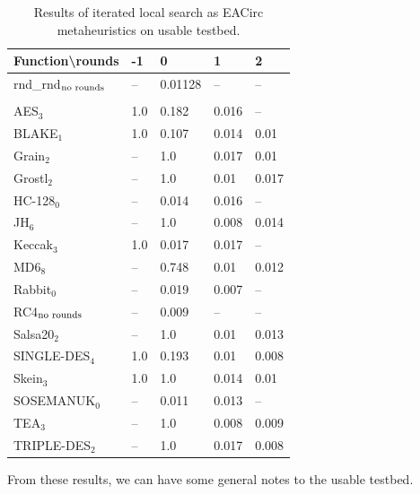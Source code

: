 \documentclass[
  print, %
  Table,   %
  nolof,     %
  nolot,     %
  11pt, %
  oneside  %
]{fithesis3}
\newcommand{\fd}{\cellcolor{red!13}}
\newcommand{\fn}{\cellcolor{green!13}}
\begin{document}
\begin{table}[H]
\centering
\begin{tabular}{l|l l l l}
Function\textbackslash{}rounds & -1 & 0 & 1 & 2\\ \hline
rnd\_rnd$_{\textnormal{no rounds}}$ & -- & \fn{}0.01128 & --         & --        \\\\
AES$_{3}$        & \fd{}1.0   & \fd{}0.182 & \fn{}0.016 & \fn{}--   \\
BLAKE$_{1}$      & \fd{}1.0   & \fd{}0.107 & \fn{}0.014 & \fn{}0.01 \\
Grain$_{2}$      & \fd{}--    & \fd{}1.0   & \fn{}0.017 & \fn{}0.01 \\
Grostl$_{2}$     & \fd{}--    & \fd{}1.0   & \fn{}0.01  & \fn{}0.017\\
HC-128$_{0}$     & \fd{}--    & \fn{}0.014 & \fn{}0.016 & \fn{}--   \\
JH$_{6}$         & \fd{}--    & \fd{}1.0   & \fn{}0.008 & \fn{}0.014\\
Keccak$_{3}$     & \fd{}1.0   & \fn{}0.017 & \fn{}0.017 & \fn{}--   \\
MD6$_{8}$        & \fd{}--    & \fd{}0.748 & \fn{}0.01  & \fn{}0.012\\
Rabbit$_{0}$     & \fd{}--    & \fn{}0.019 & \fn{}0.007 & \fn{}--   \\
RC4$_{\textnormal{no rounds}}$& --         & \fn{}0.009 & --         & --        \\
Salsa20$_{2}$    & \fd{}--    & \fd{}1.0   & \fn{}0.01  & \fn{}0.013\\
SINGLE-DES$_{4}$ & \fd{}1.0   & \fd{}0.193 & \fn{}0.01  & \fn{}0.008\\
Skein$_{3}$      & \fd{}1.0   & \fd{}1.0   & \fn{}0.014 & \fn{}0.01 \\
SOSEMANUK$_{0}$  & \fd{}--    & \fn{}0.011 & \fn{}0.013 & \fn{}--   \\
TEA$_{3}$        & \fd{}--    & \fd{}1.0   & \fn{}0.008 & \fn{}0.009\\
TRIPLE-DES$_{2}$ & \fd{}--    & \fd{}1.0   & \fn{}0.017 & \fn{}0.008
\end{tabular}
\caption{Results of iterated local search as EACirc metaheuristics on usable testbed.}
\label{table:res-usable-ils}
\end{table}

From these results, we can have some general notes to the usable testbed.
\end{document}
